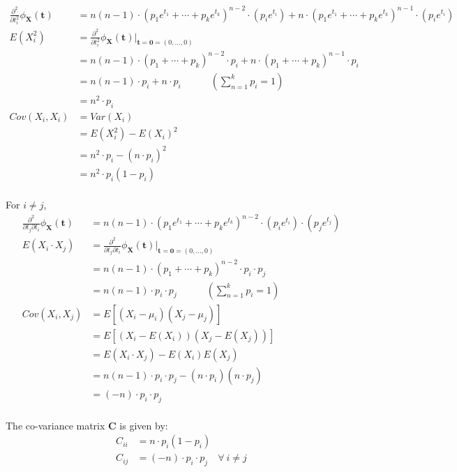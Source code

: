 \documentclass[11pt, fleqn]{article}
\begin{document}
\begin{equation*}
    \begin{split}
        \frac{\partial^2}{\partial t_i^2} \phi_{\mathbf{X}}(\mathbf{t}) &= n(n-1) \cdot (p_1 e^{t_1} + \cdots + p_k e^{t_k})^{n-2} \cdot (p_i e^{t_i}) + n \cdot (p_1 e^{t_1} + \cdots + p_k e^{t_k})^{n-1} \cdot (p_i e^{t_i}) \\
        E(X_i^2) &= \frac{\partial^2}{\partial t_i^2} \phi_{\mathbf{X}}(\mathbf{t}) \bigg\rvert_{\mathbf{t} = \mathbf{0} = (0, \dots, 0)} \\
            &= n(n-1) \cdot (p_1 + \cdots + p_k)^{n-2} \cdot p_i + n \cdot (p_1 + \cdots + p_k)^{n-1} \cdot p_i \\
            &= n(n-1) \cdot p_i + n \cdot p_i \hspace{3em} (\sum_{n=1}^{k} p_i = 1) \\
            &= n^2 \cdot p_i \\
        Cov(X_i, X_i) &= Var(X_i) \\
            &= E(X_i^2) - E(X_i)^2 \\
            &= n^2 \cdot p_i - (n \cdot p_i)^2 \\
            &= n^2 \cdot p_i (1 - p_i) \\
    \end{split}
\end{equation*}

For $i \ne j$,
\begin{equation*}
    \begin{split}
        \frac{\partial^2}{\partial t_j \partial t_i} \phi_{\mathbf{X}}(\mathbf{t}) &= n(n-1) \cdot (p_1 e^{t_1} + \cdots + p_k e^{t_k})^{n-2} \cdot (p_i e^{t_i}) \cdot (p_j e^{t_j}) \\
        E(X_i \cdot X_j) &= \frac{\partial^2}{\partial t_j \partial t_i} \phi_{\mathbf{X}}(\mathbf{t}) \bigg\rvert_{\mathbf{t} = \mathbf{0} = (0, \dots, 0)} \\
            &= n(n-1) \cdot (p_1 + \cdots + p_k)^{n-2} \cdot p_i \cdot p_j \\
            &= n(n-1) \cdot p_i  \cdot p_j \hspace{3em} (\sum_{n=1}^{k} p_i = 1) \\
        Cov(X_i, X_j) &= E[(X_i - \mu_i)(X_j - \mu_j)] \\
            &= E[(X_i - E(X_i))(X_j - E(X_j))] \\
            &= E(X_i \cdot X_j) - E(X_i)E(X_j) \\
            &= n(n-1) \cdot p_i  \cdot p_j - (n \cdot p_i)(n \cdot p_j) \\
            &= (-n) \cdot p_i \cdot p_j  \\
    \end{split}
\end{equation*}

The co-variance matrix $\mathbf{C}$ is given by:
\begin{equation*}
    \begin{split}
        C_{ii} &= n \cdot p_i (1 - p_i) \\
        C_{ij} &= (-n) \cdot p_i \cdot p_j \quad \forall \ i \ne j \\
    \end{split}
\end{equation*}
\end{document}
